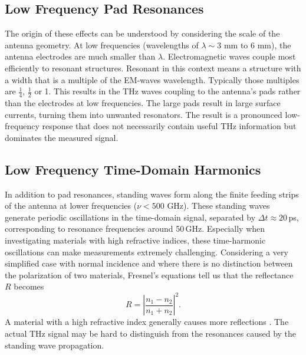 \subsection{Low Frequency Pad Resonances}

The origin of these effects can be understood by considering the scale of the antenna geometry. At low frequencies (wavelengths of $\lambda \sim 3\,$\,\si{\milli \meter} to $6\,$\,\si{\milli \meter}), the antenna electrodes are much smaller
than $\lambda$. Electromagnetic waves couple most efficiently to resonant structures. Resonant in this context means a structure with a width that is a multiple of the EM-waves wavelength. Typically those multiples are $\frac{1}{4}$, $\frac{1}{2}$ or \num{1}. This results in the THz waves coupling to the antenna's pads rather than the electrodes at low frequencies. The large pads result in large surface currents, turning them into unwanted resonators. The result is a pronounced low-frequency
response that does not necessarily contain useful THz information but dominates the measured signal.

\subsection{Low Frequency Time-Domain Harmonics}

In addition to pad resonances, standing waves form along the finite feeding strips of the antenna at lower frequencies ($\nu < 500$ \si{\giga \hertz}). These standing waves generate periodic oscillations in the time-domain signal, separated by $\Delta t \approx 20$\,\si{\pico \s}, corresponding to resonance frequencies around \num{50}\,\si{\giga \hertz}. Especially when investigating materials with high refractive indices, these time-harmonic oscillations can make measurements extremely challenging. Considering a very simplified case with normal incidence and where there is no distinction between the polarization of two materials, Fresnel's equations tell us that the reflectance $R$ becomes 
\begin{equation}
    R = \left| \frac{n_1 - n_2}{n_1 + n_2} \right|^2.
\end{equation}
A material with a high refractive index generally causes more reflections \cite{gallegosRefractiveIndex2025}. The actual THz signal may be hard to distinguish from the resonances caused by the standing wave propagation.

